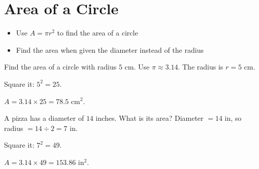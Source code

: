 \section{Area of a Circle}

\begin{stepGoal}
\begin{itemize}
    \item Use $A = \pi r^{2}$ to find the area of a circle
    \item Find the area when given the diameter instead of the radius
\end{itemize}
\end{stepGoal}

\begin{stepVocabBox}
\end{stepVocabBox}

\begin{stepsCard}
\end{stepsCard}

\begin{stepExample}{Find the area of a circle with radius $5$ cm. Use $\pi \approx 3.14$.}
     The radius is $r = 5$ cm.

     Square it: $5^{2} = 25$.

     $A = 3.14 \times 25 = 78.5$ cm$^{2}$.
\end{stepExample}

\begin{stepExample}{A pizza has a diameter of $14$ inches. What is its area?}
     Diameter $= 14$ in, so radius $= 14 \div 2 = 7$ in.

     Square it: $7^{2} = 49$.

     $A = 3.14 \times 49 = 153.86$ in$^{2}$.
\end{stepExample}

